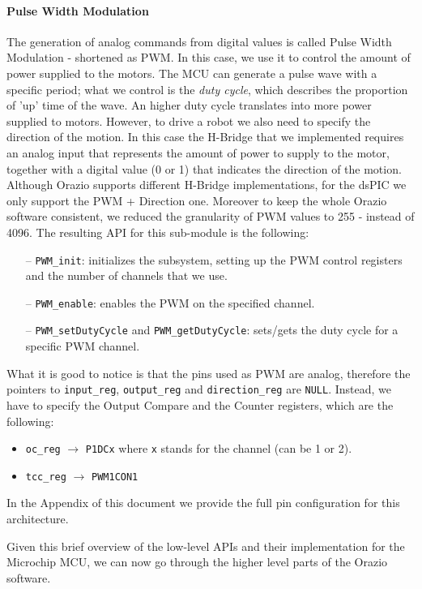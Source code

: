 \documentclass[10pt,a4paper, notitlepage]{report}
\begin{document}
\paragraph{Pulse Width Modulation} The generation of analog commands from digital values is called Pulse Width Modulation - shortened as PWM. In this case, we use it to control the amount of power supplied to the motors. The MCU can generate a pulse wave with a specific period; what we control is the \textit{duty cycle}, which describes the proportion of 'up' time of the wave. An higher duty cycle translates into more power supplied to motors. 
However, to drive a robot we also need to specify the direction of the motion. In this case the H-Bridge that we implemented requires an analog input that represents the amount of power to supply to the motor, together with a digital value (0 or 1) that indicates the direction of the motion. 
Although Orazio supports different H-Bridge implementations, for the dsPIC we only support the PWM + Direction one. Moreover to keep the whole Orazio software consistent, we reduced the granularity of PWM values to 255 - instead of 4096.
The resulting API for this sub-module is the following:
\begin{itemize}
  \item[--] \texttt{PWM\_init}: initializes the subsystem, setting up the PWM control registers and the number of channels that we use.
  \item[--] \texttt{PWM\_enable}: enables the PWM on the specified channel.
  \item[--] \texttt{PWM\_setDutyCycle} and \texttt{PWM\_getDutyCycle}: sets/gets the duty cycle for a specific PWM channel.
\end{itemize}
What it is good to notice is that the pins used as PWM are analog, therefore the pointers to \texttt{input\_reg}, \texttt{output\_reg} and \texttt{direction\_reg} are \texttt{NULL}. Instead, we have to specify the Output Compare and the Counter registers, which are the following:
\begin{itemize}
  \item \texttt{oc\_reg} $\rightarrow$ \texttt{P1DCx} where \texttt{x} stands for the channel (can be 1 or 2).
  \item \texttt{tcc\_reg} $\rightarrow$ \texttt{PWM1CON1}
\end{itemize}
In the Appendix of this document we provide the full pin configuration for this architecture.

\vspace{10px}
Given this brief overview of the low-level APIs and their implementation for the Microchip MCU, we can now go through the higher level parts of the Orazio software.
\end{document}
